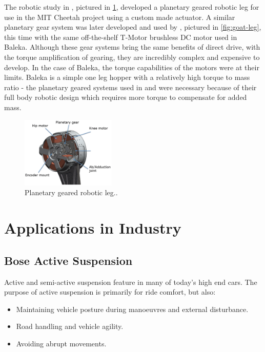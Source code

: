 The robotic study in \cite{Wang2012}, pictured in \cref{fig:Planetary geared robotic leg}, developed a planetary geared robotic leg for use in the MIT Cheetah project using a custom made actuator. A similar planetary gear system was later developed and used by \cite{Kalouche2016}, pictured in \cref{fig:goat-leg}, this time with the same off-the-shelf T-Motor brushless DC motor used in Baleka. Although these gear systems bring the same benefits of direct drive, with the torque amplification of gearing, they are incredibly complex and expensive to develop. In the case of Baleka, the torque capabilities of the motors were at their limits. Baleka is a simple one leg hopper with a relatively high torque to mass ratio - the planetary geared systems used in \cite{Wang2012} and \cite{Kalouche2016} were necessary because of their full body robotic design which requires more torque to compensate for added mass.

\begin{figure}
\centering
\includegraphics[width=0.4\textwidth]{images/literature/planetary-motor.png} 
\caption{Planetary geared robotic leg.\cite{Wang2012}.}
\label{fig:Planetary geared robotic leg}
\end{figure}

\section{Applications in Industry}

\subsection{Bose Active Suspension}

Active and semi-active suspension feature in many of today's high end cars. The purpose of active suspension is primarily for ride comfort, but also:\cite{Tseng2015}
\begin{itemize}
\item Maintaining vehicle posture during manoeuvres and external disturbance.
\item Road handling and vehicle agility.
\item Avoiding abrupt movements.
\end{itemize}

